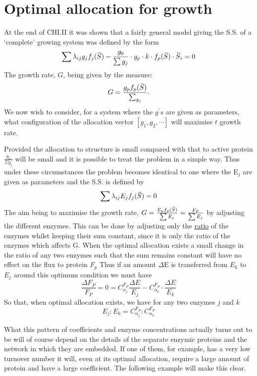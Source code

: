 \section{Optimal allocation for growth}

At the end of CHI.II it was shown that a fairly general model giving the S.S. of a `complete' growing system was defined by the form%
%
$$ \sum \lambda_{ij} g_j f_j(\,\overline{\!{S}})-\frac{g_0}{\sum g_j} \cdot g_p \cdot k \cdot f_p(\,\overline{\!{S}}) \cdot \,\overline{\!{S}}_i=0 $$
%
The growth rate, $G$, being given by the measure:
%
$$G=\dfrac{g_{p} f_{p}(\,\overline{\!{S}})}{\sum_{g_j}}. $$
%
We now wish to consider, for a system where the $g^{\prime}s$ are given as parameters, what configuration of the allocation vector $\left[g_{1}, g_{2}, \cdots\right]$ will maximise $t$ growth rate.

Provided the allocation to structure is small compared with that to active protein $\frac{g_{0}}{\Sigma g_{j}}$ will be small and it is possible to treat the problem in a simple way. Thus under these circumstances the problem becomes identical to one where the $\mathrm{E}_{j}$ are given as parameters and the S.S. is defined by
%
$$
\sum \lambda_{ij} E_{j} f_{j}(\,\overline{\!{S}}) = 0
$$
%
The aim being to maximise the growth rate, $G=\frac{E_{p} f_{p}(\,\overline{\!{S}})}{\sum E_j} = \frac{F_P}{\sum E_j}$ by adjusting the different enzymes. This can be done by adjusting only the \underline{ratio} of the enzymes whilst keeping their sum constant, since it is only the ratio of the enzymes which affects G. When the optimal allocation exists a small change in the ratio of any two enzymes such that the sum remains constant will have no effect on the flux to protein $F_{p}$ Thus if an amount $\Delta \mathrm{E}$ is transferred from $E_{k}$ to $E_{j}$ around this optimum condition we must have
%
$$
\frac{\Delta F_P}{F_P} = 0 = C_{\alpha_{j}}^{F_P} \frac{\Delta E}{E_{j}} - C_{\alpha_{k}}^{F_P} \cdot \frac{\Delta E}{E_{k}}
$$
%
So that, when optimal allocation exists, we have for any two enzymes $j$ and $k$
%
\begin{equation}
E_{j} : E_{k} = C_{\alpha_{j}}^{F_P} : C_{\alpha_{k}}^{F_P}
\label{eqn:353}
\end{equation}

What this pattern of coefficients and enzyme concentrations actually turns out to be will of course depend on the details of the separate enzymic proteins and the network in which they are embedded. If one of them, for example, has a very low turnover number it will, even at its optimal allocation, require a large amount of protein and have a large coefficient. The following example will make this clear.

